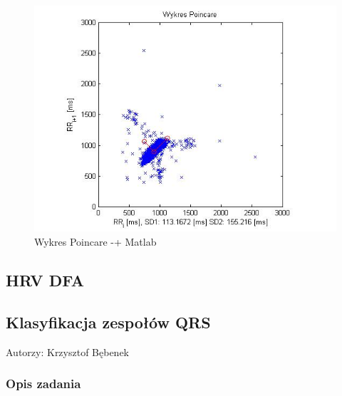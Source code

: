 \documentclass[a4paper, 11pt]{article}
\begin{document}
\begin{center}
%
\begin{figure}
\begin{centering}
\includegraphics[scale=0.7]{include/hrv2_3}
\par\end{centering}

\caption{Wykres Poincare -+ Matlab}
\label{fig:hrv2_3}
\end{figure}

\par\end{center}

\subsection{HRV DFA}
\label{sec:hrvd_fa}

\subsection{Klasyfikacja zespołów QRS}
\label{sec:qrs_class}
Autorzy: Krzysztof Bębenek

\subsubsection{Opis zadania}
\label{sec:qrs_class:desc}
\end{document}
